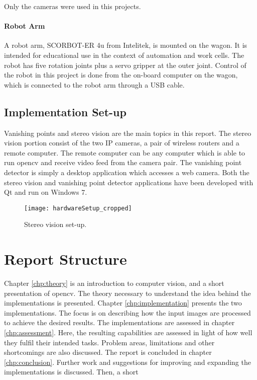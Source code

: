 Only the cameras were used in this projects. 

\paragraph{Robot Arm}

A robot arm, SCORBOT-ER 4u from Intelitek, is mounted on the wagon. It is intended for educational use in the context of automation and work cells. The robot has five rotation joints plus a servo gripper at the outer joint. Control of the robot in this project is done from the on-board computer on the wagon, which is connected to the robot arm through a USB cable. 


\subsection{Implementation Set-up}

Vanishing points and stereo vision are the main topics in this report. The stereo vision portion consist of the two IP cameras, a pair of wireless routers and a remote computer. The remote computer can be any computer which is able to run \gls{opencv} and receive video feed from the camera pair. The vanishing point detector is simply a desktop application which accesses a web camera. Both the stereo vision and vanishing point detector applications have been developed with Qt and run on Windows 7.

\begin{figure}
	\texttt{[image: hardwareSetup\_cropped]}
	\caption{\label{fig:hardware}Stereo vision set-up.}
\end{figure}

\section{Report Structure}
Chapter \ref{chp:theory} is an introduction to computer vision, and a short presentation of \gls{opencv}. The theory necessary to understand the idea behind the implementations is presented. Chapter \ref{chp:implementation} presents the two implementations. The focus is on describing how the input images are processed to achieve the desired results. The implementations are assessed in chapter \ref{chp:assessment}. Here, the resulting capabilities are assessed in light of how well they fulfil their intended tasks. Problem areas, limitations and other shortcomings are also discussed. The report is concluded in chapter \ref{chp:conclusion}. Further work and suggestions for improving and expanding the implementations is discussed. Then, a short